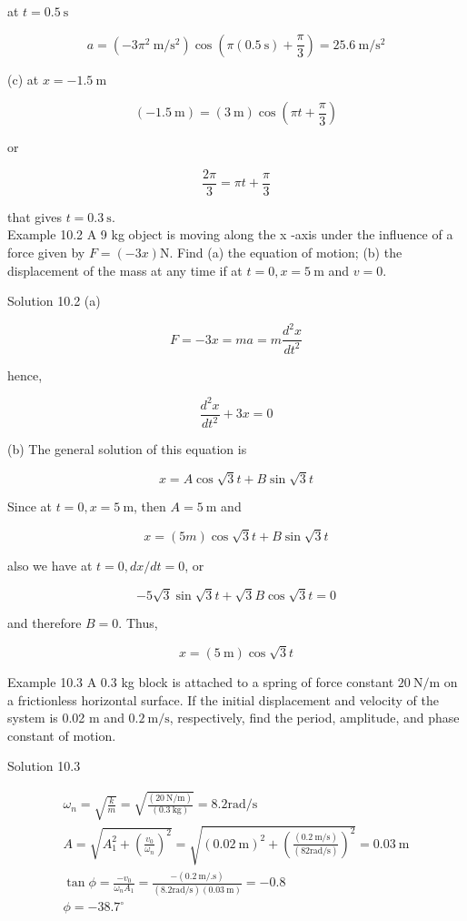 \documentclass[10pt]{article}
\numberwithin{equation}{section}
\begin{document}
at $t=0.5 \mathrm{~s}$

$$
a=\left(-3 \pi^{2} \mathrm{~m} / \mathrm{s}^{2}\right) \cos \left(\pi(0.5 \mathrm{~s})+\frac{\pi}{3}\right)=25.6 \mathrm{~m} / \mathrm{s}^{2}
$$

(c) at $x=-1.5 \mathrm{~m}$

$$
(-1.5 \mathrm{~m})=(3 \mathrm{~m}) \cos \left(\pi t+\frac{\pi}{3}\right)
$$

or

$$
\frac{2 \pi}{3}=\pi t+\frac{\pi}{3}
$$

that gives $t=0.3 \mathrm{~s}$.\\
Example 10.2 A 9 kg object is moving along the x -axis under the influence of a force given by $F=(-3 x) \mathrm{N}$. Find (a) the equation of motion; (b) the displacement of the mass at any time if at $t=0, x=5 \mathrm{~m}$ and $v=0$.

Solution 10.2 (a)

$$
F=-3 x=m a=m \frac{d^{2} x}{d t^{2}}
$$

hence,

$$
\frac{d^{2} x}{d t^{2}}+3 x=0
$$

(b) The general solution of this equation is

$$
x=A \cos \sqrt{3} t+B \sin \sqrt{3} t
$$

Since at $t=0, x=5 \mathrm{~m}$, then $A=5 \mathrm{~m}$ and

$$
x=(5 m) \cos \sqrt{3} t+B \sin \sqrt{3} t
$$

also we have at $t=0, d x / d t=0$, or

$$
-5 \sqrt{3} \sin \sqrt{3} t+\sqrt{3} B \cos \sqrt{3} t=0
$$

and therefore $B=0$. Thus,

$$
x=(5 \mathrm{~m}) \cos \sqrt{3} t
$$

Example 10.3 A 0.3 kg block is attached to a spring of force constant $20 \mathrm{~N} / \mathrm{m}$ on a frictionless horizontal surface. If the initial displacement and velocity of the system is 0.02 m and $0.2 \mathrm{~m} / \mathrm{s}$, respectively, find the period, amplitude, and phase constant of motion.

Solution 10.3

$$
\begin{gathered}
\omega_{n}=\sqrt{\frac{k}{m}}=\sqrt{\frac{(20 \mathrm{~N} / \mathrm{m})}{(0.3 \mathrm{~kg})}}=8.2 \mathrm{rad} / \mathrm{s} \\
A=\sqrt{A_{1}^{2}+\left(\frac{v_{0}}{\omega_{n}}\right)^{2}}=\sqrt{(0.02 \mathrm{~m})^{2}+\left(\frac{(0.2 \mathrm{~m} / \mathrm{s})}{(82 \mathrm{rad} / \mathrm{s})}\right)^{2}}=0.03 \mathrm{~m} \\
\tan \phi=\frac{-v_{0}}{\omega_{n} A_{1}}=\frac{-(0.2 \mathrm{~m} / . \mathrm{s})}{(8.2 \mathrm{rad} / \mathrm{s})(0.03 \mathrm{~m})}=-0.8 \\
\phi=-38.7^{\circ}
\end{gathered}
$$
\end{document}
